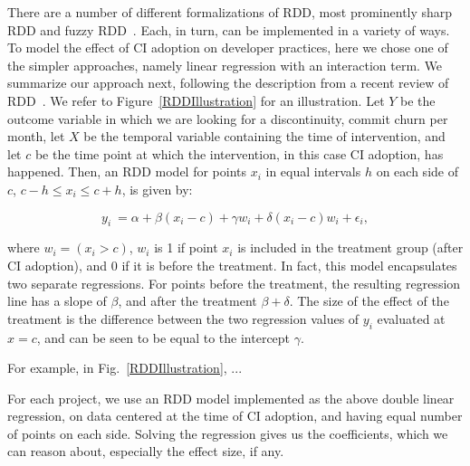 There are a number of different formalizations of RDD, most prominently 
sharp RDD and fuzzy RDD~\cite{imbens2008regression}.
Each, in turn, can be implemented in a variety of ways.
To model the effect of CI adoption on developer practices, here we chose one 
of the simpler approaches, namely linear regression with an interaction term.
We summarize our approach next, following the description from a recent 
review of RDD~\cite{}. 
We refer to Figure~\ref{RDDIllustration} for an illustration.
Let $Y$ be the outcome variable in which we are looking for a discontinuity, 
\eg commit churn per month, let $X$ be the temporal variable containing the 
time of intervention, and let $c$ be the time point at which the intervention, in 
this case CI adoption, has happened.
Then, an RDD model for points $x_i$ in equal intervals $h$ on each side of 
$c$, $c-h \le x_i \le c+h$, is given by:

\[y_i \ = \alpha + \beta(x_i-c) + \gamma w_i + \delta(x_i-c)w_i + \epsilon_i,\]

\noindent where $w_i = (x_i > c)$, \ie $w_i$ is 1 if point $x_i$ is included in 
the treatment group (\eg after CI adoption), and 0 if it is before the treatment.
In fact, this model encapsulates two separate regressions.
For points before the treatment, the resulting regression line has a slope of 
$\beta$, and after the treatment $\beta + \delta$.
The size of the effect of the treatment is the difference between the two 
regression values of $y_i$ evaluated at $x=c$, and can be seen to be equal 
to the intercept $\gamma$.

For example, in Fig.~\ref{RDDIllustration}, ...

For each project, we use an RDD model implemented as the above 
double linear regression, on data centered at the time of CI adoption, and 
having equal number of points on each side.
Solving the regression gives us the coefficients, which we can reason about, 
especially the effect size, if any.
 

